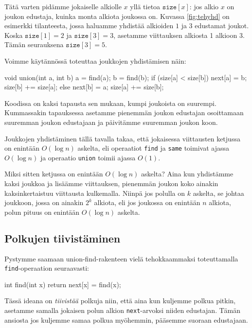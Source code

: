 Tätä varten pidämme jokaiselle alkiolle $x$ yllä tietoa
$\texttt{size}[x]$: jos alkio $x$ on joukon edustaja,
kuinka monta alkiota joukossa on.
Kuvassa \ref{fig:tehyhd} on esimerkki tilanteesta,
jossa haluamme yhdistää alkioiden $1$ ja $3$ edustamat joukot.
Koska $\texttt{size}[1]=2$ ja $\texttt{size}[3]=3$,
asetamme viittauksen alkiosta 1 alkioon 3.
Tämän seurauksena $\texttt{size}[3]=5$.

Voimme käytännössä toteuttaa joukkojen yhdistämisen näin:

\begin{code}
void union(int a, int b) {
    a = find(a);
    b = find(b);
    if (size[a] < size[b]) {
        next[a] = b;
        size[b] += size[a];
    } else {
        next[b] = a;
        size[a] += size[b];
    }
}
\end{code}

Koodissa on kaksi tapausta sen mukaan, kumpi joukoista on suurempi.
Kummassakin tapauksessa asetamme pienemmän joukon edustajan
osoittamaan suuremman joukon edustajaan ja päivitämme suuremman
joukon koon.

Joukkojen yhdistäminen tällä tavalla takaa, että jokaisessa
viittausten ketjussa on enintään $O(\log n)$ askelta,
eli operaatiot \texttt{find} ja \texttt{same} toimivat
ajassa $O(\log n)$ ja operaatio \texttt{union} toimii ajassa $O(1)$.

Miksi sitten ketjussa on enintään $O(\log n)$ askelta?
Aina kun yhdistämme kaksi joukkoa ja lisäämme viittauksen,
pienemmän joukon koko ainakin kaksinkertaistuu viittausta kulkemalla.
Niinpä jos polulla on $k$ askelta, se johtaa joukkoon,
jossa on ainakin $2^k$ alkiota, eli jos joukossa on enintään $n$
alkiota, polun pituus on enintään $O(\log n)$ askelta.

\subsection{Polkujen tiivistäminen}

Pystymme saamaan union-find-rakenteen vielä tehokkaammaksi
toteuttamalla \texttt{find}-operaation seuraavasti:

\begin{code}
int find(int x) {
    return next[x] = find(x);
}
\end{code}

Tässä ideana on \emph{tiivistää} polkuja niin,
että aina kun kuljemme polkua pitkin, asetamme samalla
jokaisen polun alkion \texttt{next}-arvoksi niiden edustajan.
Tämän ansiosta jos kuljemme samaa polkua myöhemmin, 
pääsemme suoraan edustajaan.


